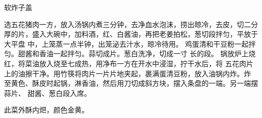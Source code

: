 \begin{recipe}{软炸子盖}

\ingredients


\preparation

\step 选五花猪肉一方，放入汤锅内煮三分钟，去净血水泡沫，捞出晾冷，去皮，切二分
厚的片，盛入大碗中，加料酒，红、白酱油，再把老姜拍松，葱切段拌匀，平放于大平盘
中，上笼蒸一点半钟，出笼泌去汁水，晾冷待用。
\step 鸡蛋清和干豆粉一起拌匀。甜酱和香油一起拌匀。蒜切成片。葱白洗净，切成一寸
长的段。
\step 锅放炉上烧红，将菜油放入烧至七成热，用净布一方在开水中浸湿，拧干水后，将
五花肉片上的油擦干净。用竹筷将肉片一片片地夹起，裹满蛋清豆粉，放入油锅内炸。炸
至黄色、酥皮时起锅，淋香油，然后用刀切成斜方块，摆入条盘的一端。另一端摆蒜片、
甜酱、葱白段入席。

\features

此菜外酥内𤆵，颜色金黄。

\end{recipe}

